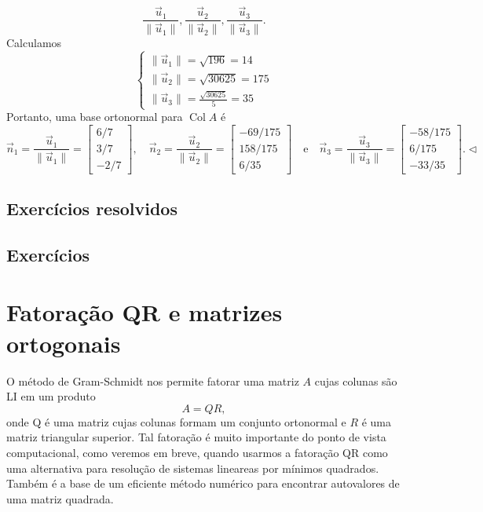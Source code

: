 \documentclass[../livro.tex]{subfiles}  %
\begin{document}
\begin{example}
\begin{equation}
\frac{\vec{u}_1}{\|\vec{u}_1\|}, \frac{\vec{u}_2}{\|\vec{u}_2\|}, \frac{\vec{u}_3}{\|\vec{u}_3\|}.
\end{equation} Calculamos
\begin{equation}
\left\{
  \begin{array}{ll}
   \|\vec{u}_1\| = \sqrt{196} = 14 \\
   \|\vec{u}_2\| = \sqrt{30625} = 175 \\
   \|\vec{u}_3\| = \frac{\sqrt{30625}}{5} = 35
  \end{array}
\right.
\end{equation} Portanto, uma base ortonormal para $\operatorname{Col} A$ é
\begin{equation}
\vec{n}_1 = \frac{\vec{u}_1}{\|\vec{u}_1\|} =
\begin{bmatrix}
 6/7  \\
 3/7  \\
 -2/7
\end{bmatrix}, \quad
\vec{n}_2 = \frac{\vec{u}_2}{\|\vec{u}_2\|} =
\begin{bmatrix}
 -69/175  \\
 158/175  \\
 6/35
\end{bmatrix} \quad \text{e} \quad
\vec{n}_3 = \frac{\vec{u}_3}{\|\vec{u}_3\|} =
\begin{bmatrix}
 -58/175  \\
 6/175  \\
 -33/35
\end{bmatrix}. \lhd
\end{equation}
\end{example}

\subsection*{Exercícios resolvidos}

\construirExeresol

\subsection*{Exercícios}

\construirExer

\section{Fatoração QR e matrizes ortogonais}


O método de Gram-Schmidt nos permite fatorar uma matriz $A$ cujas colunas são LI em um produto \begin{equation}A=QR,\end{equation} onde Q é uma matriz cujas colunas formam um conjunto ortonormal e $R$ é uma matriz triangular superior. Tal fatoração é muito importante do ponto de vista computacional, como veremos em breve, quando usarmos a fatoração QR como uma alternativa  para resolução de sistemas lineareas por mínimos quadrados. Também é a base de um eficiente método numérico para encontrar autovalores de uma matriz quadrada.
\end{document}
